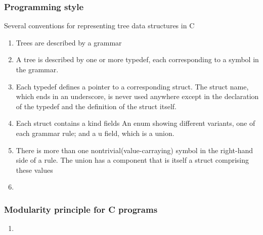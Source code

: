 \subsubsection{Programming style}
Several conventions for representing tree data structures in C
\begin{enumerate}
    \item Trees are described by a grammar
    \item A tree is described by one or more typedef, each corresponding to a symbol in the grammar.
    \item Each typedef defines a pointer to a corresponding struct.
    \subitem The struct name, which ends in an underscore, is never used anywhere except in the declaration of the typedef and the definition of the struct itself.
    \item Each struct contains a kind fields
    \subitem An enum showing different variants, one of each grammar rule; and a u field, which is a union.
    \item There is more than one nontrivial(value-carraying) symbol in the right-hand side of a rule. The union has a component that is itself a struct comprising these values
    \item %
\end{enumerate}


\subsubsection{Modularity principle for C programs}
\begin{enumerate}
    \item %
\end{enumerate}
